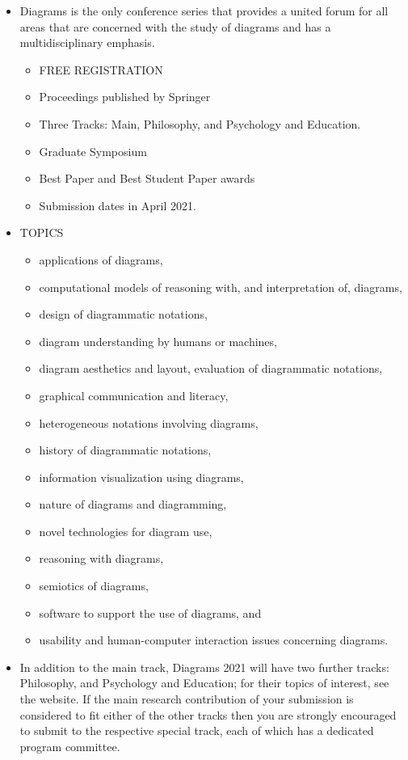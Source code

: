 \documentclass{article}
\begin{document}
\begin{itemize}\item  Diagrams is the only conference series that provides a united forum for all areas that are concerned with the study of diagrams and has a multidisciplinary emphasis. 
 
\begin{itemize}\item  FREE REGISTRATION
\item  Proceedings published by Springer
\item  Three Tracks: Main, Philosophy, and Psychology and Education.
\item  Graduate Symposium
\item  Best Paper and Best Student Paper awards
\item  Submission dates in April 2021.
\end{itemize} 
\item  TOPICS 
 
\begin{itemize}\item  applications of diagrams,
\item  computational models of reasoning with, and interpretation of, diagrams,
\item  design of diagrammatic notations,
\item  diagram understanding by humans or machines,
\item  diagram aesthetics and layout, evaluation of diagrammatic notations,
\item  graphical communication and literacy,
\item  heterogeneous notations involving diagrams,
\item  history of diagrammatic notations,
\item  information visualization using diagrams,
\item  nature of diagrams and diagramming,
\item  novel technologies for diagram use,
\item  reasoning with diagrams,
\item  semiotics of diagrams,
\item  software to support the use of diagrams, and
\item  usability and human-computer interaction issues concerning diagrams.
\end{itemize} 
\item  In addition to the main track, Diagrams 2021 will have two further tracks: Philosophy, and Psychology and Education; for their topics of interest, see the website. If the main research contribution of your submission is considered to fit either of the other tracks then you are strongly encouraged to submit to the respective special track, each of which has a dedicated program committee. 
 

\end{itemize}
\end{document}
